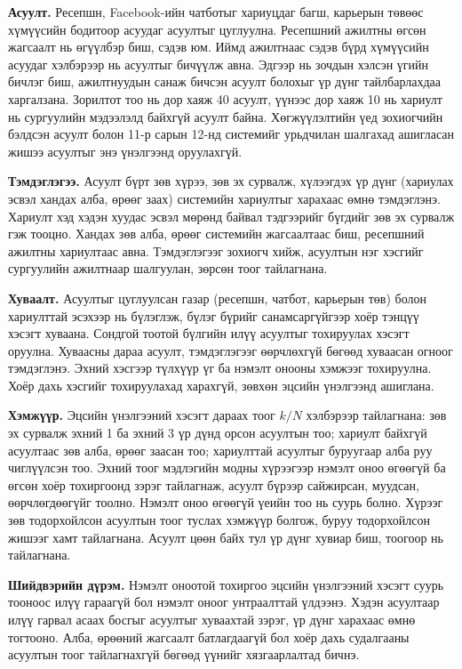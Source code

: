 \textbf{Асуулт.} Ресепшн, Facebook-ийн чатботыг хариуцдаг багш, карьерын төвөөс хүмүүсийн бодитоор асуудаг асуултыг цуглуулна. Ресепшний ажилтны өгсөн жагсаалт нь өгүүлбэр биш, сэдэв юм. Иймд ажилтнаас сэдэв бүрд хүмүүсийн асуудаг хэлбэрээр нь асуултыг бичүүлж авна. Эдгээр нь зочдын хэлсэн үгийн бичлэг биш, ажилтнуудын санаж бичсэн асуулт болохыг үр дүнг тайлбарлахдаа харгалзана. Зорилтот тоо нь дор хаяж 40 асуулт, үүнээс дор хаяж 10 нь хариулт нь сургуулийн мэдээлэлд байхгүй асуулт байна. Хөгжүүлэлтийн үед зохиогчийн бэлдсэн асуулт болон 11-р сарын 12-нд системийг урьдчилан шалгахад ашигласан жишээ асуултыг энэ үнэлгээнд оруулахгүй.

\textbf{Тэмдэглэгээ.} Асуулт бүрт зөв хүрээ, зөв эх сурвалж, хүлээгдэх үр дүнг (хариулах эсвэл хандах алба, өрөөг заах) системийн хариултыг харахаас өмнө тэмдэглэнэ. Хариулт хэд хэдэн хуудас эсвэл мөрөнд байвал тэдгээрийг бүгдийг зөв эх сурвалж гэж тооцно. Хандах зөв алба, өрөөг системийн жагсаалтаас биш, ресепшний ажилтны хариултаас авна. Тэмдэглэгээг зохиогч хийж, асуултын нэг хэсгийг сургуулийн ажилтнаар шалгуулан, зөрсөн тоог тайлагнана.

\textbf{Хуваалт.} Асуултыг цуглуулсан газар (ресепшн, чатбот, карьерын төв) болон хариулттай эсэхээр нь бүлэглэж, бүлэг бүрийг санамсаргүйгээр хоёр тэнцүү хэсэгт хуваана. Сондгой тоотой бүлгийн илүү асуултыг тохируулах хэсэгт оруулна. Хуваасны дараа асуулт, тэмдэглэгээг өөрчлөхгүй бөгөөд хуваасан огноог тэмдэглэнэ. Эхний хэсгээр түлхүүр үг ба нэмэлт онооны хэмжээг тохируулна. Хоёр дахь хэсгийг тохируулахад харахгүй, зөвхөн эцсийн үнэлгээнд ашиглана.

\textbf{Хэмжүүр.} Эцсийн үнэлгээний хэсэгт дараах тоог $k/N$ хэлбэрээр тайлагнана: зөв эх сурвалж эхний 1 ба эхний 3 үр дүнд орсон асуултын тоо; хариулт байхгүй асуултаас зөв алба, өрөөг заасан тоо; хариулттай асуултыг буруугаар алба руу чиглүүлсэн тоо. Эхний тоог мэдлэгийн модны хүрээгээр нэмэлт оноо өгөөгүй ба өгсөн хоёр тохиргоонд зэрэг тайлагнаж, асуулт бүрээр сайжирсан, муудсан, өөрчлөгдөөгүйг тоолно. Нэмэлт оноо өгөөгүй үеийн тоо нь суурь болно. Хүрээг зөв тодорхойлсон асуултын тоог туслах хэмжүүр болгож, буруу тодорхойлсон жишээг хамт тайлагнана. Асуулт цөөн байх тул үр дүнг хувиар биш, тоогоор нь тайлагнана.

\textbf{Шийдвэрийн дүрэм.} Нэмэлт оноотой тохиргоо эцсийн үнэлгээний хэсэгт суурь тооноос илүү гараагүй бол нэмэлт оноог унтраалттай үлдээнэ. Хэдэн асуултаар илүү гарвал асаах босгыг асуултыг хуваахтай зэрэг, үр дүнг харахаас өмнө тогтооно. Алба, өрөөний жагсаалт батлагдаагүй бол хоёр дахь судалгааны асуултын тоог тайлагнахгүй бөгөөд үүнийг хязгаарлалтад бичнэ.

